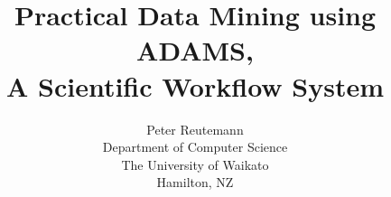 \documentclass[a4paper,10pt]{article}
\title{Practical Data Mining using ADAMS, \\ A Scientific Workflow System}
\author{Peter Reutemann \\ Department of Computer Science \\ The University of Waikato \\ Hamilton, NZ}
\begin{document}
\maketitle

\begin{abstract}
\end{abstract}
\end{document}
